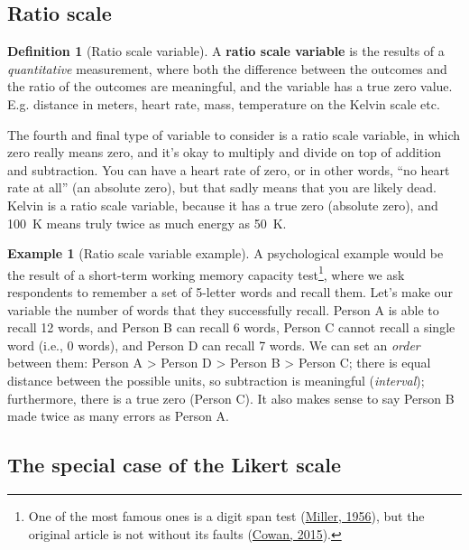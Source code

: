 \documentclass[
  11pt,
]{book}
\theoremstyle{definition}
\newtheorem{definition}{Definition}[chapter]
\theoremstyle{definition}
\newtheorem{example}{Example}[chapter]
\theoremstyle{definition}
\theoremstyle{definition}
\theoremstyle{remark}
\begin{document}
\hypertarget{ratioscale}{%
\subsection{Ratio scale}\label{ratioscale}}

\begin{definition}[Ratio scale variable]
\protect\hypertarget{def:defratio}{}\label{def:defratio}A \textbf{ratio scale variable} is the results of a \emph{quantitative} measurement, where both the difference between the outcomes and the ratio of the outcomes are meaningful, and the variable has a true zero value. E.g. distance in meters, heart rate, mass, temperature on the Kelvin scale etc.
\end{definition}

The fourth and final type of variable to consider is a ratio scale variable, in which zero really means zero, and it's okay to multiply and divide on top of addition and subtraction. You can have a heart rate of zero, or in other words, ``no heart rate at all'' (an absolute zero), but that sadly means that you are likely dead. Kelvin is a ratio scale variable, because it has a true zero (absolute zero), and 100~K means truly twice as much energy as 50~K.

\begin{example}[Ratio scale variable example]
\protect\hypertarget{exm:exratio}{}\label{exm:exratio}A psychological example would be the result of a short-term working memory capacity test\footnote{One of the most famous ones is a digit span test (\protect\hyperlink{ref-millerMagicalNumberSeven1956}{Miller, 1956}), but the original article is not without its faults (\protect\hyperlink{ref-cowanGeorgeMillerMagical2015}{Cowan, 2015}).}, where we ask respondents to remember a set of 5-letter words and recall them. Let's make our variable the number of words that they successfully recall. Person A is able to recall 12 words, and Person B can recall 6 words, Person C cannot recall a single word (i.e., 0 words), and Person D can recall 7 words. We can set an \emph{order} between them: Person A \textgreater{} Person D \textgreater{} Person B \textgreater{} Person C; there is equal distance between the possible units, so subtraction is meaningful (\emph{interval}); furthermore, there is a true zero (Person C). It also makes sense to say Person B made twice as many errors as Person A.
\end{example}

\hypertarget{likertscale}{%
\subsection{The special case of the Likert scale}\label{likertscale}}
\end{document}
